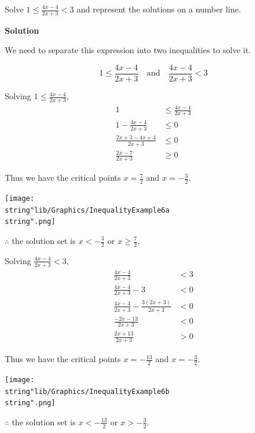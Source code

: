 \documentclass[11pt,a4paper]{book}
\begin{document}
\begin{example}{}

Solve ${\displaystyle 1\leq\frac{4x-4}{2x+3}<3}$ and represent the
solutions on a number line.

\textbf{Solution}

We need to separate this expression into two inequalities to solve
it.

\[
1\leq\frac{4x-4}{2x+3}\quad\text{and}\quad\frac{4x-4}{2x+3}<3
\]

Solving ${\displaystyle 1\leq\frac{4x-4}{2x+3}}$,
\begin{align*}
1 & \leq\frac{4x-4}{2x+3}\\
1-\frac{4x-4}{2x+3} & \leq0\\
\frac{2x+3-4x+4}{2x+3} & \leq0\\
\frac{2x-7}{2x+3} & \geq0
\end{align*}

Thus we have the critical points ${\displaystyle x=\frac{7}{2}}$
and ${\displaystyle x=-\frac{3}{2}}$.
\begin{center}
\texttt{[image: \\string"lib/Graphics/InequalityExample6a\\string".png]}
\par\end{center}

$\therefore$ the solution set is ${\displaystyle x<-\frac{3}{2}}$
or ${\displaystyle x\geq\frac{7}{2}}$.

Solving ${\displaystyle \frac{4x-4}{2x+3}<3}$,
\begin{align*}
{\displaystyle \frac{4x-4}{2x+3}} & <3\\
{\displaystyle \frac{4x-4}{2x+3}}-3 & <0\\
{\displaystyle \frac{4x-4}{2x+3}}-\frac{3\left(2x+3\right)}{2x+3} & <0\\
\frac{-2x-13}{2x+3} & <0\\
\frac{2x+13}{2x+3} & >0
\end{align*}

Thus we have the critical points ${\displaystyle x=-\frac{13}{2}}$
and ${\displaystyle x=-\frac{3}{2}}$.
\begin{center}
\texttt{[image: \\string"lib/Graphics/InequalityExample6b\\string".png]}
\par\end{center}

$\therefore$ the solution set is ${\displaystyle x<-\frac{13}{2}}$
or ${\displaystyle x>-\frac{3}{2}}$.


\end{example}
\end{document}
